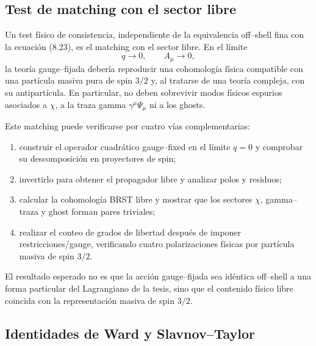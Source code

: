 \documentclass[11pt,a4paper]{article}
\numberwithin{equation}{section}
\begin{document}
\subsection{Test de matching con el sector libre}
\label{subsec:test-de-matching-con-el-sector-libre}

Un test físico de consistencia, independiente de la equivalencia off--shell fina con la ecuación (8.23), es el matching con el sector libre. En el límite
\begin{equation}
q\to0,
\qquad
A_\mu\to0,
\end{equation}
la teoría gauge--fijada debería reproducir una cohomología física compatible con una partícula masiva pura de spin $3/2$ y, al tratarse de una teoría compleja, con su antipartícula. En particular, no deben sobrevivir modos físicos espurios asociados a $\chi$, a la traza gamma $\gamma^\mu\Psi_\mu$ ni a los ghosts.

Este matching puede verificarse por cuatro vías complementarias:
\begin{enumerate}[label=(\roman*)]
\item construir el operador cuadrático gauge--fixed en el límite $q=0$ y comprobar su descomposición en proyectores de spin;
\item invertirlo para obtener el propagador libre y analizar polos y residuos;
\item calcular la cohomología BRST libre y mostrar que los sectores $\chi$, gamma--traza y ghost forman pares triviales;
\item realizar el conteo de grados de libertad después de imponer restricciones/gauge, verificando cuatro polarizaciones físicas por partícula masiva de spin $3/2$.
\end{enumerate}

El resultado esperado no es que la acción gauge--fijada sea idéntica off--shell a una forma particular del Lagrangiano de la tesis, sino que el contenido físico libre coincida con la representación masiva de spin $3/2$.

\subsection{Identidades de Ward y Slavnov--Taylor}
\label{subsec:identidades-de-ward-y-slavnov-taylor}
\end{document}
